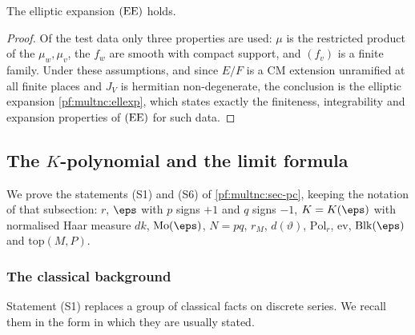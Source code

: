 \begin{theorem}\label{pf:multnc:ellpart}
The elliptic expansion $\textup{(EE)}$ holds.
\end{theorem}

\begin{proof}
Of the test data only three properties are used: $\mu$ is the restricted product of the $\mu_w,\mu_v$, the $f_w$ are
smooth with compact support, and $(f_v)$ is a finite family. Under these assumptions, and since $E/F$ is a CM extension
unramified at all finite places and $J_V$ is hermitian non-degenerate, the conclusion is the elliptic expansion
\cref{pf:multnc:ellexp}, which states exactly the finiteness, integrability and expansion properties of $\textup{(EE)}$
for such data.
\end{proof}


\subsection{The $K$-polynomial and the limit formula}\label{pf:multnc:sec-kpoly}

We prove the statements (S1) and (S6) of \cref{pf:multnc:sec-pc}, keeping the notation of that subsection: $r$,
$\eps$ with $p$ signs $+1$ and $q$ signs $-1$, $K=K(\eps)$ with normalised Haar measure $dk$, $\mathrm{Mo}(\eps)$,
$N=pq$, $r_M$, $d(\vartheta)$, $\mathrm{Pol}_r$, $\mathrm{ev}$, $\mathrm{Blk}(\eps)$ and $\mathrm{top}(M,P)$.

\subsubsection*{The classical background}

Statement (S1) replaces a group of classical facts on discrete series. We recall them in the form in which they are
usually stated.

